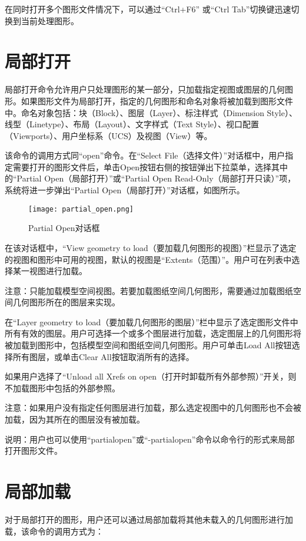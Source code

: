 在同时打开多个图形文件情况下，可以通过“Ctrl+F6” 或“Ctrl Tab”切换键迅速切换到当前处理图形。

\section{局部打开}

局部打开命令允许用户只处理图形的某一部分，只加载指定视图或图层的几何图形。如果图形文件为局部打开，指定的几何图形和命名对象将被加载到图形文件中。命名对象包括：块（Block）、图层（Layer）、标注样式（Dimension Style）、线型（Linetype）、布局（Layout）、文字样式（Text Style）、视口配置（Viewports）、用户坐标系（UCS）及视图（View）等。

该命令的调用方式同“open”命令。在“Select File（选择文件）”对话框中，用户指定需要打开的图形文件后，单击Open按钮右侧的按钮弹出下拉菜单，选择其中的“Partial Open（局部打开）”或“Partial Open Read-Only（局部打开只读）”项，系统将进一步弹出“Partial Open（局部打开）”对话框，如图所示。

\begin{figure}[htbp]
\centering
\texttt{[image: partial\_open.png]}
\caption{Partial Open对话框}
\end{figure}

在该对话框中，“View geometry to load（要加载几何图形的视图）”栏显示了选定的视图和图形中可用的视图，默认的视图是“Extents（范围）”。用户可在列表中选择某一视图进行加载。

注意：只能加载模型空间视图。若要加载图纸空间几何图形，需要通过加载图纸空间几何图形所在的图层来实现。

在“Layer geometry to load（要加载几何图形的图层）”栏中显示了选定图形文件中所有有效的图层。用户可选择一个或多个图层进行加载，选定图层上的几何图形将被加载到图形中，包括模型空间和图纸空间几何图形。用户可单击Load All按钮选择所有图层，或单击Clear All按钮取消所有的选择。

如果用户选择了“Unload all Xrefs on open（打开时卸载所有外部参照）”开关，则不加载图形中包括的外部参照。

注意：如果用户没有指定任何图层进行加载，那么选定视图中的几何图形也不会被加载，因为其所在的图层没有被加载。

说明：用户也可以使用“partialopen”或“-partialopen”命令以命令行的形式来局部打开图形文件。

\section{局部加载}

对于局部打开的图形，用户还可以通过局部加载将其他未载入的几何图形进行加载，该命令的调用方式为：

